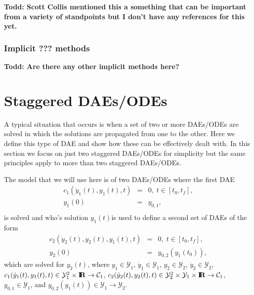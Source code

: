 \documentclass[pdf,ps2pdf,11pt]{SANDreport}
\begin{document}
\cite{FETime}
{}\textbf{Todd: Scott Collis mentioned this a something that can be important
from a variety of standpoints but I don't have any references for this yet.}

\subsubsection{Implicit ??? methods}

{}\textbf{Todd: Are there any other implicit methods here?}


\section{Staggered DAEs/ODEs}
\label{rythmos:sec:staggered-daes}

A typical situation that occurs is when a set of two or more DAEs/ODEs are
solved in which the solutions are propagated from one to the other.  Here we
define this type of DAE and show how these can be effectively dealt with.  In
this section we focus on just two staggered DAEs/ODEs for simplicity but the
same principles apply to more than two staggered DAEs/ODEs.

The model that we will use here is of two DAEs/ODEs where the first DAE
%
\begin{eqnarray}
%
c_1(\dot{y}_1(t),y_1(t),t) & = & 0,
\; t \in \left[ t_0, t_f \right], \label{rythmos:eqn:stag:c1} \\
y_1(0) & = & y_{0,1}, \label{rythmos:eqn:stag:c1:ic} \\
%
\end{eqnarray}
%
is solved and who's solution $y_1(t)$is used to define a second set of DAEs of
the form
%
\begin{eqnarray}
%
c_2(\dot{y}_2(t),y_2(t),y_1(t),t) & = & 0,
\; t \in \left[ t_0, t_f \right], \label{rythmos:eqn:stag:c2} \\
y_2(0) & = & y_{0,2}(y_1(t_0)), \label{rythmos:eqn:stag:c2:ic}
%
\end{eqnarray}
%
which are solved for $y_2(t)$, where $y_1\in\mathcal{Y}_1$,
$\dot{y}_1\in\mathcal{Y}_1$, $y_2\in\mathcal{Y}_2$,
$\dot{y}_2\in\mathcal{Y}_2$, $c_1(\dot{y}_1(t),y_1(t),t) {}\in
{}\mathcal{Y}_1^2 {}\times {}\mbox{\textbf{I}}\hspace{-0.6ex}\mbox{\textbf{R}} {}\rightarrow {}\mathcal{C}_1$,
$c_2(\dot{y}_2(t),y_2(t),t) {}\in {}\mathcal{Y}_2^2 {}\times {}\mathcal{Y}_1
{}\times {}\mbox{\textbf{I}}\hspace{-0.6ex}\mbox{\textbf{R}} {}\rightarrow {}\mathcal{C}_1$, $y_{0,1}\in\mathcal{Y}_1$, and
$y_{0,2}(y_1(t)) {}\in {}\mathcal{Y}_1 {}\rightarrow {}\mathcal{Y}_2$.
\end{document}
